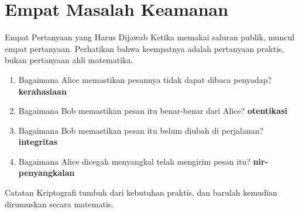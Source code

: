 \documentclass[aspectratio=169,11pt]{beamer}
\begin{document}
\section{Empat Masalah Keamanan}

\begin{frame}{Empat Pertanyaan yang Harus Dijawab}
    Ketika memakai saluran publik, muncul empat pertanyaan. Perhatikan bahwa
    keempatnya adalah pertanyaan praktis, bukan pertanyaan ahli matematika.
    \vspace{0.3cm}
    \begin{enumerate}
        \item Bagaimana Alice memastikan pesannya tidak dapat dibaca penyadap?
              \hfill\textcolor{ubbblue}{\textbf{kerahasiaan}}
        \item Bagaimana Bob memastikan pesan itu benar-benar dari Alice?
              \hfill\textcolor{ubbblue}{\textbf{otentikasi}}
        \item Bagaimana Bob memastikan pesan itu belum diubah di perjalanan?
              \hfill\textcolor{ubbblue}{\textbf{integritas}}
        \item Bagaimana Alice dicegah menyangkal telah mengirim pesan itu?
              \hfill\textcolor{ubbblue}{\textbf{nir-penyangkalan}}
    \end{enumerate}
    \vspace{0.3cm}
    \begin{exampleblock}{Catatan}
        Kriptografi tumbuh dari kebutuhan praktis, dan barulah kemudian
        dirumuskan secara matematis.
    \end{exampleblock}
\end{frame}
\end{document}
